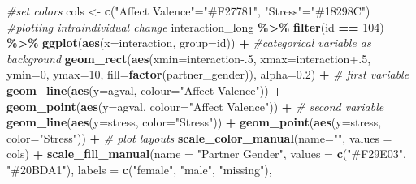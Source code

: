 \documentclass[
]{book}
\newenvironment{Shaded}{\begin{snugshade}}{\end{snugshade}}
\newcommand{\AttributeTok}[1]{\textcolor[rgb]{0.13,0.29,0.53}{#1}}
\newcommand{\CommentTok}[1]{\textcolor[rgb]{0.56,0.35,0.01}{\textit{#1}}}
\newcommand{\DecValTok}[1]{\textcolor[rgb]{0.00,0.00,0.81}{#1}}
\newcommand{\FloatTok}[1]{\textcolor[rgb]{0.00,0.00,0.81}{#1}}
\newcommand{\FunctionTok}[1]{\textcolor[rgb]{0.13,0.29,0.53}{\textbf{#1}}}
\newcommand{\NormalTok}[1]{#1}
\newcommand{\OtherTok}[1]{\textcolor[rgb]{0.56,0.35,0.01}{#1}}
\newcommand{\SpecialCharTok}[1]{\textcolor[rgb]{0.81,0.36,0.00}{\textbf{#1}}}
\newcommand{\StringTok}[1]{\textcolor[rgb]{0.31,0.60,0.02}{#1}}
\theoremstyle{definition}
\theoremstyle{definition}
\theoremstyle{definition}
\theoremstyle{definition}
\theoremstyle{remark}
\begin{document}
\begin{Shaded}
\begin{Highlighting}[]
\CommentTok{\#set colors}
\NormalTok{cols }\OtherTok{\textless{}{-}} \FunctionTok{c}\NormalTok{(}\StringTok{"Affect Valence"}\OtherTok{=}\StringTok{"\#F27781"}\NormalTok{, }\StringTok{"Stress"}\OtherTok{=}\StringTok{"\#18298C"}\NormalTok{)}
\CommentTok{\#plotting intraindividual change }
\NormalTok{interaction\_long }\SpecialCharTok{\%\textgreater{}\%}
  \FunctionTok{filter}\NormalTok{(id }\SpecialCharTok{==} \DecValTok{104}\NormalTok{) }\SpecialCharTok{\%\textgreater{}\%}
  \FunctionTok{ggplot}\NormalTok{(}\FunctionTok{aes}\NormalTok{(}\AttributeTok{x=}\NormalTok{interaction, }\AttributeTok{group=}\NormalTok{id)) }\SpecialCharTok{+}
  \CommentTok{\#categorical variable as background}
  \FunctionTok{geom\_rect}\NormalTok{(}\FunctionTok{aes}\NormalTok{(}\AttributeTok{xmin=}\NormalTok{interaction}\FloatTok{{-}.5}\NormalTok{, }\AttributeTok{xmax=}\NormalTok{interaction}\FloatTok{+.5}\NormalTok{, }\AttributeTok{ymin=}\DecValTok{0}\NormalTok{, }\AttributeTok{ymax=}\DecValTok{10}\NormalTok{,}
                \AttributeTok{fill=}\FunctionTok{factor}\NormalTok{(partner\_gender)), }\AttributeTok{alpha=}\FloatTok{0.2}\NormalTok{) }\SpecialCharTok{+}
  \CommentTok{\# first variable}
  \FunctionTok{geom\_line}\NormalTok{(}\FunctionTok{aes}\NormalTok{(}\AttributeTok{y=}\NormalTok{agval, }\AttributeTok{colour=}\StringTok{"Affect Valence"}\NormalTok{)) }\SpecialCharTok{+}
  \FunctionTok{geom\_point}\NormalTok{(}\FunctionTok{aes}\NormalTok{(}\AttributeTok{y=}\NormalTok{agval, }\AttributeTok{colour=}\StringTok{"Affect Valence"}\NormalTok{)) }\SpecialCharTok{+}
  \CommentTok{\# second variable}
  \FunctionTok{geom\_line}\NormalTok{(}\FunctionTok{aes}\NormalTok{(}\AttributeTok{y=}\NormalTok{stress, }\AttributeTok{color=}\StringTok{"Stress"}\NormalTok{)) }\SpecialCharTok{+}
  \FunctionTok{geom\_point}\NormalTok{(}\FunctionTok{aes}\NormalTok{(}\AttributeTok{y=}\NormalTok{stress, }\AttributeTok{color=}\StringTok{"Stress"}\NormalTok{)) }\SpecialCharTok{+}
  \CommentTok{\# plot layouts}
  \FunctionTok{scale\_color\_manual}\NormalTok{(}\AttributeTok{name=}\StringTok{""}\NormalTok{, }\AttributeTok{values =}\NormalTok{ cols) }\SpecialCharTok{+}
  \FunctionTok{scale\_fill\_manual}\NormalTok{(}\AttributeTok{name =} \StringTok{"Partner Gender"}\NormalTok{,}
                    \AttributeTok{values =} \FunctionTok{c}\NormalTok{(}\StringTok{"\#F29E03"}\NormalTok{, }\StringTok{"\#20BDA1"}\NormalTok{), }
                    \AttributeTok{labels =} \FunctionTok{c}\NormalTok{(}\StringTok{"female"}\NormalTok{, }\StringTok{"male"}\NormalTok{, }\StringTok{"missing"}\NormalTok{),}

\end{Highlighting}
\end{Shaded}
\end{document}
